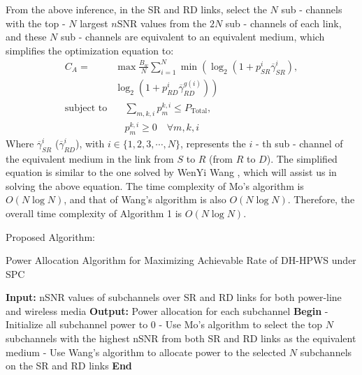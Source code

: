 \documentclass[lettersize,journal]{IEEEtran}
\begin{document}
	From the above inference, in the SR and RD links, select the \(N\) sub - channels with the top - \(N\) largest \(n\text{SNR}\) values from the \(2N\) sub - channels of each link, and these \(N\) sub - channels are equivalent to an equivalent medium, which simplifies the optimization equation to:
	\begin{equation}
		\begin{aligned}
			C_A =& \max \frac{B_w}{N} \sum_{i = 1}^N \min \left( \log_2 \left(1 + p_{SR}^i \overline{\gamma}_{SR}^i \right), \right. \\
			& \left. \log_2 \left(1 + p_{RD}^i \overline{\gamma}_{RD}^{g(i)} \right) \right) \\
			\text{subject to} & \quad \sum_{m,k,i} p_m^{k,i} \leq P_{\text{Total}}, \\
			& \quad p_m^{k,i} \geq 0 \quad \forall m,k,i
		\end{aligned}
	\end{equation}
	Where \(\overline{\gamma}_{SR}^i\) (\(\overline{\gamma}_{RD}^i\)), with \(i \in \{1, 2, 3, \cdots, N\}\), represents the \(i\) - th sub - channel of the equivalent medium in the link from \(S\) to \(R\) (from \(R\) to \(D\)). The simplified equation is similar to the one solved by WenYi Wang \cite{wenyi2008}, which will assist us in solving the above equation. The time complexity of Mo's algorithm is \( O(N \log N) \), and that of Wang's algorithm is also \( O(N \log N) \). Therefore, the overall time complexity of Algorithm 1 is \( O(N \log N) \).
	
	Proposed Algorithm:
	\begin{algorithm}[H]
		\caption{Power Allocation Algorithm for Maximizing Achievable Rate of DH-HPWS under SPC}\label{alg:alg1}
		\begin{algorithmic}
			\STATE \textbf{Input:} nSNR values of subchannels over SR and RD links for both power-line and wireless media
			\STATE \textbf{Output:} Power allocation for each subchannel
			\STATE
			\STATE \textbf{Begin}
			\STATE \quad - Initialize all subchannel power to 0
			\STATE \quad - Use Mo's algorithm to select the top $N$ subchannels with the highest nSNR from both SR and RD links as the equivalent medium
			\STATE \quad - Use Wang's algorithm to allocate power to the selected $N$ subchannels on the SR and RD links
			\STATE \textbf{End}
		\end{algorithmic}
		\label{alg1}
	\end{algorithm}
	
\end{document}
